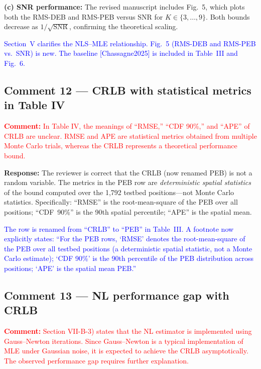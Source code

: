\documentclass[11pt]{article}
\newcommand{\reviewercomment}[1]{\noindent\textcolor{red}{\textbf{Comment:} #1}\par\vspace{6pt}}
\newcommand{\response}{\noindent\textbf{Response:} }
\newcommand{\change}[1]{\textcolor{blue}{#1}}
\begin{document}
\textbf{(c) SNR performance:} The revised manuscript includes Fig.~5, which plots both the RMS-DEB and RMS-PEB versus SNR for $K\in\{3,\ldots,9\}$. Both bounds decrease as $1/\sqrt{\text{SNR}}$, confirming the theoretical scaling.

\change{Section~V clarifies the NLS--MLE relationship. Fig.~5 (RMS-DEB and RMS-PEB vs.\ SNR) is new. The baseline [Chassagne2025] is included in Table~III and Fig.~6.}

\subsection{Comment 12 --- CRLB with statistical metrics in Table IV}

\reviewercomment{In Table IV, the meanings of ``RMSE,'' ``CDF 90\%,'' and ``APE'' of CRLB are unclear. RMSE and APE are statistical metrics obtained from multiple Monte Carlo trials, whereas the CRLB represents a theoretical performance bound.}

\response The reviewer is correct that the CRLB (now renamed PEB) is not a random variable. The metrics in the PEB row are \emph{deterministic spatial statistics} of the bound computed over the 1,792 testbed positions---not Monte Carlo statistics. Specifically: ``RMSE'' is the root-mean-square of the PEB over all positions; ``CDF~90\%'' is the 90th spatial percentile; ``APE'' is the spatial mean.

\change{The row is renamed from ``CRLB'' to ``PEB'' in Table~III. A footnote now explicitly states: ``For the PEB rows, `RMSE' denotes the root-mean-square of the PEB over all testbed positions (a deterministic spatial statistic, not a Monte Carlo estimate); `CDF 90\%' is the 90th percentile of the PEB distribution across positions; `APE' is the spatial mean PEB.''}

\subsection{Comment 13 --- NL performance gap with CRLB}

\reviewercomment{Section VII-B-3) states that the NL estimator is implemented using Gauss--Newton iterations. Since Gauss--Newton is a typical implementation of MLE under Gaussian noise, it is expected to achieve the CRLB asymptotically. The observed performance gap requires further explanation.}
\end{document}

